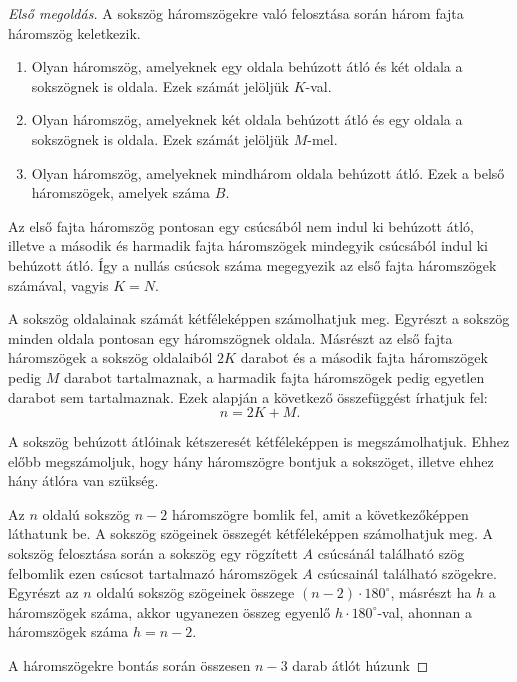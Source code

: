 \begin{proof}[Első megoldás]
A sokszög háromszögekre való felosztása során három fajta háromszög
keletkezik. 
\begin{enumerate}
\item Olyan háromszög, amelyeknek egy oldala behúzott átló és két oldala
a sokszögnek is oldala. Ezek számát jelöljük $K$-val.
\item Olyan háromszög, amelyeknek két oldala behúzott átló és egy oldala
a sokszögnek is oldala. Ezek számát jelöljük $M$-mel.
\item Olyan háromszög, amelyeknek mindhárom oldala behúzott átló. Ezek a
belső háromszögek, amelyek száma $B$. 
\end{enumerate}
Az első fajta háromszög pontosan egy csúcsából nem indul ki behúzott
átló, illetve a második és harmadik fajta háromszögek mindegyik csúcsából
indul ki behúzott átló. Így a nullás csúcsok száma megegyezik az első
fajta háromszögek számával, vagyis $K=N$.\par %
A sokszög oldalainak számát kétféleképpen számolhatjuk meg. Egyrészt
a sokszög minden oldala pontosan egy háromszögnek oldala. Másrészt
az első fajta háromszögek a sokszög oldalaiból $2K$ darabot és a
második fajta háromszögek pedig $M$ darabot tartalmaznak, a harmadik
fajta háromszögek pedig egyetlen darabot sem tartalmaznak. Ezek alapján
a következő összefüggést írhatjuk fel: 
\begin{equation}
n=2K+M.\label{felixxx-1}
\end{equation}
\par A sokszög behúzott átlóinak kétszeresét kétféleképpen is megszámolhatjuk.
Ehhez előbb meg\-számol\-juk, hogy hány háromszögre bontjuk a sokszöget,
illetve ehhez hány átlóra van szükség.\par Az $n$ oldalú sokszög
$n-2$ háromszögre bomlik fel, amit a következőképpen láthatunk be.
A sokszög szögeinek összegét kétféleképpen számolhatjuk meg. A sokszög
felosztása során a sokszög egy rögzített $A$ csúcsánál található
szög felbomlik ezen csúcsot tartalmazó háromszögek $A$ csúcsainál
található szögekre. Egyrészt az $n$ oldalú sokszög szögeinek összege
$(n-2)\cdot180^{\circ}$, másrészt ha $h$ a háromszögek száma, akkor
ugyanezen összeg egyenlő $h\cdot180^{\circ}$-val, ahonnan a háromszögek
száma $h=n-2$. \\
\par A háromszögekre bontás során összesen $n-3$ darab átlót húzunk

\end{proof}
